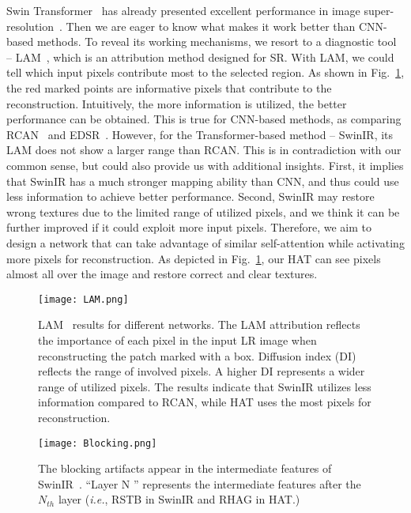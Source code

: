\documentclass[10pt,twocolumn,letterpaper]{article}
\begin{document}
Swin Transformer~\cite{swin_t} has already presented excellent performance in image super-resolution~\cite{swinir}. Then we are eager to know what makes it work better than CNN-based methods. To reveal its working mechanisms, we resort to a diagnostic tool -- LAM~\cite{lam}, which is an attribution method designed for SR. With LAM, we could tell which input pixels contribute most to the selected region. As shown in Fig.~\ref{lam}, the red marked points are informative pixels that contribute to the reconstruction. Intuitively, the more information is utilized, the better performance can be obtained. This is true for CNN-based methods, as comparing RCAN~\cite{rcan} and EDSR~\cite{edsr}. However, for the Transformer-based method -- SwinIR, its LAM does not show a larger range than RCAN. This is in contradiction with our common sense, but could also provide us with additional insights. First, it implies that SwinIR has a much stronger mapping ability than CNN, and thus could use less information to achieve better performance. Second, SwinIR may restore wrong textures due to the limited range of utilized pixels, and we think it can be further improved if it could exploit more input pixels. Therefore, we aim to design a network that can take advantage of similar self-attention while activating more pixels for reconstruction. As depicted in Fig.~\ref{lam}, our HAT can see pixels almost all over the image and restore correct and clear textures. 



\begin{figure}[!t]
\centering
\texttt{[image: LAM.png]}
\vspace{-0.3cm}
\caption{LAM~\cite{lam} results for different networks. The LAM attribution reflects the importance of each pixel in the input LR image when reconstructing the patch marked with a box.
Diffusion index (DI)~\cite{lam} reflects the range of involved pixels. A higher DI represents a wider range of utilized pixels. The results indicate that SwinIR utilizes less information compared to RCAN, while HAT uses the most pixels for reconstruction.}
\label{lam}
\vspace{-0.4cm}
\end{figure}

\begin{figure}[!t]
\centering
\texttt{[image: Blocking.png]}
\vspace{-0.4cm}
\caption{The blocking artifacts appear in the intermediate features of SwinIR~\cite{swinir}. “Layer N ” represents the intermediate features after the $N_{th}$ layer (\textit{i.e.}, RSTB in SwinIR and RHAG in HAT.)}
\label{feature}
\vspace{-0.6cm}
\end{figure}
\end{document}
